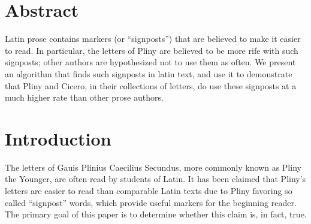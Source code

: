 \iffalse
(*
 * Copyright (c) 2015, 
 *  Martin Kellogg          <mjk6zt@cs.virginia.edu>
 * All rights reserved.
 * 
 * Redistribution and use in source and binary forms, with or without
 * modification, are permitted provided that the following conditions are
 * met:
 *
 * 1. Redistributions of source code must retain the above copyright
 * notice, this list of conditions and the following disclaimer.
 *
 * 2. Redistributions in binary form must reproduce the above copyright
 * notice, this list of conditions and the following disclaimer in the
 * documentation and/or other materials provided with the distribution.
 *
 * 3. The names of the contributors may not be used to endorse or promote
 * products derived from this software without specific prior written
 * permission.
 *
 * THIS SOFTWARE IS PROVIDED BY THE COPYRIGHT HOLDERS AND CONTRIBUTORS "AS
 * IS" AND ANY EXPRESS OR IMPLIED WARRANTIES, INCLUDING, BUT NOT LIMITED
 * TO, THE IMPLIED WARRANTIES OF MERCHANTABILITY AND FITNESS FOR A
 * PARTICULAR PURPOSE ARE DISCLAIMED. IN NO EVENT SHALL THE COPYRIGHT OWNER
 * OR CONTRIBUTORS BE LIABLE FOR ANY DIRECT, INDIRECT, INCIDENTAL, SPECIAL,
 * EXEMPLARY, OR CONSEQUENTIAL DAMAGES (INCLUDING, BUT NOT LIMITED TO,
 * PROCUREMENT OF SUBSTITUTE GOODS OR SERVICES; LOSS OF USE, DATA, OR
 * PROFITS; OR BUSINESS INTERRUPTION) HOWEVER CAUSED AND ON ANY THEORY OF
 * LIABILITY, WHETHER IN CONTRACT, STRICT LIABILITY, OR TORT (INCLUDING
 * NEGLIGENCE OR OTHERWISE) ARISING IN ANY WAY OUT OF THE USE OF THIS
 * SOFTWARE, EVEN IF ADVISED OF THE POSSIBILITY OF SUCH DAMAGE.
 *)
\fi

\section{Abstract}

Latin prose contains markers (or ``signposts'') that are believed to make it easier to read. In particular, the letters of Pliny are believed to be more rife with such signposts; other authors are hypothesized not to use them as often. We present an algorithm that finds such signposts in latin text, and use it to demonstrate that Pliny and Cicero, in their collections of letters, do use these signposts at a much higher rate than other prose authors.    

\section{Introduction}
\label{sec:Intro}

The letters of Gauis Plinius Caecilius Secundus, more commonly known as Pliny the Younger, are often read by students of Latin.  It has been claimed \cite{Woodmanpm} that Pliny's letters are easier to read than comparable Latin texts due to Pliny favoring so called ``signpost'' words, which provide useful markers for the beginning reader. The primary goal of this paper is to determine whether this claim is, in fact, true.

